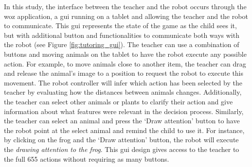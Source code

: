 In this study, the interface between the teacher and the robot occurs through the \gls{woz} application, a \gls{gui} running on a tablet and allowing the teacher and the robot to communicate. This \gls{gui} represents the state of the game as the child sees it, but with additional button and functionalities to communicate both ways with the robot (see Figure \ref{fig:tutoring_gui}). The teacher can use a combination of buttons and moving animals on the tablet to have the robot execute any possible action. For example, to move animals close to another item, the teacher can drag and release the animal's image to a position to request the robot to execute this movement. The robot controller will infer which action has been selected by the teacher by evaluating how the distances between animals changes. Additionally, the teacher can select other animals or plants to clarify their action and give information about what features were relevant in the decision process. Similarly, the teacher can select an animal and press the `Draw attention' button to have the robot point at the select animal and remind the child to use it.
For instance, by clicking on the frog and the `Draw attention' button, the robot will execute the \textit{drawing attention to the frog}. 
This \gls{gui} design gives access to the teacher to the full 655 actions without requiring as many buttons. %


